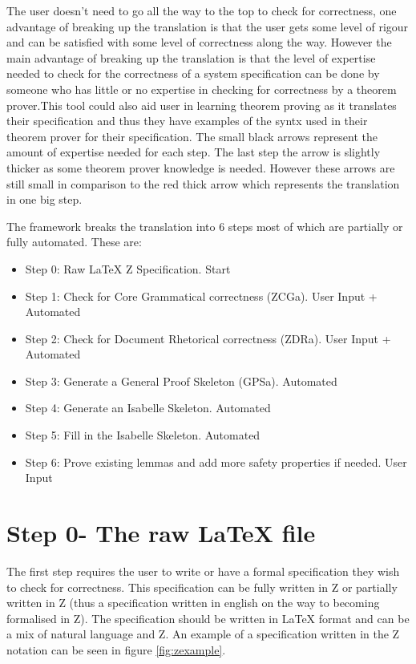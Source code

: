 The user doesn't need to go all the way to the top to check for correctness, one advantage of breaking up the translation is that the user gets some level of rigour and can be satisfied with some level of correctness along the way. However the main advantage of breaking up the translation is that the level of expertise needed to check for the correctness of a system specification can be done by someone who has little or no expertise in checking for correctness by a theorem prover.This tool could also aid user in learning theorem proving as it translates their specification and thus they have examples of the syntx used in their theorem prover for their specification. The small black arrows represent the amount of expertise needed for each step. The last step the arrow is slightly thicker as some theorem prover knowledge is needed. However these arrows are still small in comparison to the red thick arrow which represents the translation in one big step.

The framework breaks the translation into 6 steps most of which are partially or fully automated. These are:

\begin{itemize}
\item Step 0: Raw LaTeX Z Specification. {\color{set}Start}
\item Step 1: Check for Core Grammatical correctness (ZCGa). {\color{set}User Input + Automated}
\item Step 2: Check for Document Rhetorical correctness (ZDRa). {\color{set}User Input + Automated}
\item Step 3: Generate a General Proof Skeleton (GPSa). {\color{set}Automated}
\item Step 4: Generate an Isabelle Skeleton. {\color{set}Automated}
\item Step 5: Fill in the Isabelle Skeleton. {\color{set}Automated}
\item Step 6: Prove existing lemmas and add more safety properties if needed. {\color{set}User Input}
\end{itemize}

\section{Step 0- The raw LaTeX file}

The first step requires the user to write or have a formal specification they wish to check for correctness. This specification can be fully written in Z or partially written in Z (thus a specification written in english on the way to becoming formalised in Z). The specification should be written in \LaTeX{} format and can be a mix of natural language and Z. An example of a specification written in the Z notation can be seen in figure \ref{fig:zexample}.

